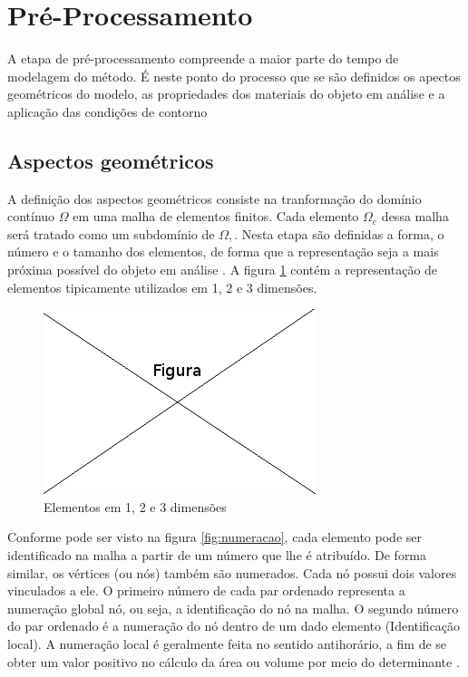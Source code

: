 \documentclass[
    12pt,               %
    openright,          %
    oneside,
    a4paper,            %
    english,            %
    french,             %
    spanish,            %
    brazil              %
    ]{abntex2}
\begin{document}
\section{Pré-Processamento}
\label{sec:preProc}

A etapa de pré-processamento compreende a maior parte do tempo de modelagem do método. É neste ponto do processo que se são definidos os apectos geométricos do modelo, as propriedades dos materiais do objeto em análise e a aplicação das condições de contorno \cite[p. 9, 665]{zien}

\subsection{Aspectos geométricos} 
A definição dos aspectos geométricos consiste na tranformação do domínio contínuo $\Omega$ em uma malha de elementos finitos. Cada elemento $\Omega_e$ dessa malha será tratado como um subdomínio de $\Omega,$.  
Nesta etapa são definidas a forma, o número e o tamanho dos elementos, de forma que a representação seja a mais próxima possível do objeto em análise \cite[p. 154]{desai}.
A figura \ref{fig:elementos} contém a representação de elementos tipicamente utilizados em 1, 2 e 3 dimensões. 

\begin{figure}[!htb]
\centering
\includegraphics[scale=0.5]{figuras/temp.png}
\caption{Elementos em 1, 2 e 3 dimensões}
\label{fig:elementos}
\end{figure}

Conforme pode ser visto na figura \ref{fig:numeracao}, cada elemento pode ser identificado na malha a partir de um número que lhe é atribuído. De forma similar, os vértices (ou nós) também são numerados. Cada nó possui dois valores vinculados a ele. 
O primeiro número de cada par ordenado representa a numeração global nó, ou seja, a identificação do nó na malha. O segundo número do par ordenado é a numeração do nó dentro de um dado elemento (Identificação local). A numeração local é geralmente feita no sentido antihorário, a fim de se obter um valor positivo no cálculo da área ou volume por meio do  determinante \cite[p. 394]{sadiku} \cite[p. 95]{jin}. 
\end{document}
